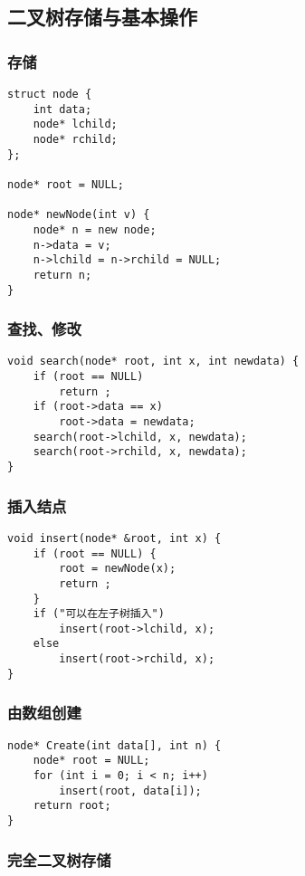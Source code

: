 \subsection{二叉树存储与基本操作}

\subsubsection{存储}

\begin{lstlisting}
struct node {
	int data;
	node* lchild;
	node* rchild;
};

node* root = NULL;

node* newNode(int v) {
	node* n = new node;
	n->data = v;
	n->lchild = n->rchild = NULL;
	return n;
}
\end{lstlisting}

\subsubsection{查找、修改}

\begin{lstlisting}
void search(node* root, int x, int newdata) {
	if (root == NULL)
		return ;
	if (root->data == x)
		root->data = newdata;
	search(root->lchild, x, newdata);
	search(root->rchild, x, newdata);
}
\end{lstlisting}

\subsubsection{插入结点}

\begin{lstlisting}
void insert(node* &root, int x) {
	if (root == NULL) {
		root = newNode(x);
		return ;
	}
	if ("可以在左子树插入")
		insert(root->lchild, x);
	else
		insert(root->rchild, x);
}
\end{lstlisting}

\subsubsection{由数组创建}

\begin{lstlisting}
node* Create(int data[], int n) {
	node* root = NULL;
	for (int i = 0; i < n; i++)
		insert(root, data[i]);
	return root;
}
\end{lstlisting}

\subsubsection{完全二叉树存储}

